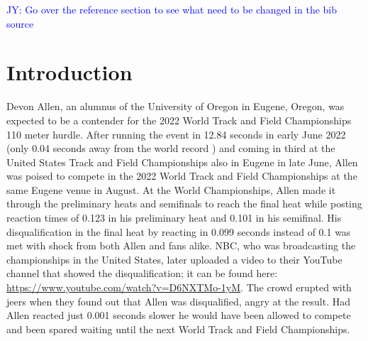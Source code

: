 \documentclass[12pt, letterpaper, titlepage]{article}
\newcommand{\jy}[1]{\textcolor{blue}{JY: #1}}
\newcommand{\eds}[1]{\textcolor{red}{EDS: (#1)}}
\begin{document}
\jy{Go over the reference section to see what need to be changed in the bib source}

\section{Introduction}
\label{sec:intro}


Devon Allen, an alumnus of the University of Oregon in 
Eugene, Oregon, was
expected to be a contender for the 2022 World Track and Field Championships 110 
meter hurdle.  After running the event in 12.84 seconds in early June 2022 
(only 0.04 seconds away from the world record \citep{wa2022preview}) and coming 
in third at the United States Track and Field 
Championships also in Eugene in late June, Allen was poised to compete in the 
2022 World Track and Field Championships at the same Eugene venue in August.
At the World Championships, Allen made it through the preliminary
heats and semifinals to reach the final heat while posting reaction times of 
0.123 in his preliminary heat and 0.101 in his semifinal.  
His disqualification in the final heat by reacting in 0.099 seconds instead of 
0.1 was met
with shock from both Allen and fans alike.  NBC, who was broadcasting the
championships in the United States, later uploaded a video to their YouTube
channel that showed the disqualification; it can be found here:
\url{https://www.youtube.com/watch?v=D6NXTMo-1yM}. The crowd erupted with jeers 
when they found out that Allen was disqualified, angry at the result.  Had Allen 
reacted just 0.001 seconds slower he would have been allowed to compete and been 
spared waiting until the next World Track and Field Championships.
\end{document}
